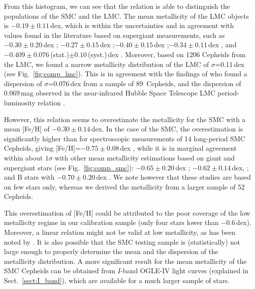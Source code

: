 \documentclass[article]{aa} %
\begin{document}
From this histogram, we can see that the relation is able to distinguish the populations of the SMC and the LMC. The mean metallicity of the LMC objects is $-0.19\pm0.11\,$dex, which is within the uncertainties and in agreement with values found in the literature based on supergiant measurements, such as $-0.30\pm0.20\,$dex \citep{Russel1989}; $-0.27\pm0.15\,$dex \citep{Hill1995};$-0.40\pm0.15\,$dex \citep{Andrievsky2001};$-0.34\pm0.11\,$dex \citep{Urbaneja2017}, and $-0.409\pm0.076\,$(stat.)$\pm 0.10\,$(syst.)$\,$dex \citep{Romaniello2022}.
Moreover, based on 1206 Cepheids from the LMC, we found a narrow metallicity distribution of the LMC of $\sigma$=0.11$\,$dex (see Fig.~\ref{fig:comp_lmc}). This is in agreement with the findings of \cite{Romaniello2022} who found a dispersion of $\sigma$=0.076$\,$dex from a sample of 89~Cepheids, and the dispersion of 0.069$\,$mag observed in the near-infrared Hubble Space Telescope LMC period-luminosity relation \citep{riess2019}.

However, this relation seems to overestimate the metallicity for the SMC with a mean [Fe/H] of $-0.30\pm0.14\,$dex. In the case of the SMC, the overestimation is significantly higher than for spectroscopic measurements of 14 long-period SMC Cepheids, giving [Fe/H]=$-0.75\pm0.08\,$dex \citep{Romaniello2008}, while it is in marginal agreement within about $1\sigma$ with other mean metallicity estimations based on giant and supergiant stars (see Fig.~\ref{fig:comp_smc}): $-0.65\pm0.20\,$dex \citep{Russel1989}; $-0.62\pm0.14\,$dex, \citep{Trundle2007}; and B stars with $-0.70\pm0.20\,$dex \citep{Korn2000}. We note however that these studies are based on few stars only, whereas we derived the metallicity from a larger sample of 52 Cepheids.

This overestimation of [Fe/H] could be attributed to the poor coverage of the low metallicity regime in our calibration sample (only four stars lower than $-0.6\,$dex). Moreover, a linear relation might not be valid at low metallicity, as has been noted by \cite{Klagyivik2013}. It is also possible that the SMC testing sample is (statistically) not large enough to properly determine the mean and the dispersion of the metallicity distribution. A more significant result for the mean metallicity of the SMC Cepheids can be obtained from $I$-band OGLE-IV light curves (explained in Sect.~\ref{sect:I_band}), which are available for a much larger sample of stars.
\end{document}
